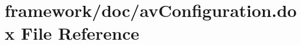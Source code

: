 \hypertarget{av_configuration_8dox}{}\section{framework/doc/av\+Configuration.dox File Reference}
\label{av_configuration_8dox}
